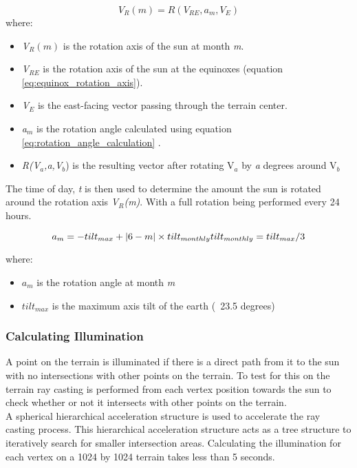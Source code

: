 \begin{equation} \label{eq:all_month_rotation_axis}
	V_{R}(m) = R(V_{RE}, a_{m}, V_{E})
\end{equation}
where:
\begin{itemize}
\item \textit{V$_{R}(m)$} is the rotation axis of the sun at month \textit{m}.\\
\item \textit{V$_{RE}$} is the rotation axis of the sun at the equinoxes (equation \ref{eq:equinox_rotation_axis}).\\
\item \textit{V$_{E}$} is the east-facing vector passing through the terrain center.\\
\item \textit{a$_{m}$} is the rotation angle calculated using equation \ref{eq:rotation_angle_calculation} .\\
\item \textit{R(V$_{a}$,\textit{a},V$_{b}$}) is the resulting vector after rotating V$_{a}$ by \textit{a} degrees around V$_{b}$\\
\end{itemize}

The time of day, \textit{t} is then used to determine the amount the sun is rotated around the rotation axis \textit{V$_{R}$(m)}. With a full rotation being performed every 24 hours.

\begin{equation} \label{eq:rotation_angle_calculation}
	a_{m} = -tilt_{max} + |6-m| \times tilt_{monthly} $$\\
$$
tilt_{monthly} = tilt_{max}/3
\end{equation}

where:
\begin{itemize}
\item \textit{$a_{m}$} is the rotation angle at month \textit{m}
\item \textit{$tilt_{max}$} is the maximum axis tilt of the earth (~23.5 degrees)
\end{itemize}

\subsubsection{Calculating Illumination}

A point on the terrain is illuminated if there is a direct path from it to the sun with no intersections with other points on the terrain. To test for this on the terrain ray casting is performed from each vertex position towards the sun to check whether or not it intersects with other points on the terrain.\\
A spherical hierarchical acceleration structure is used to accelerate the ray casting process. This hierarchical acceleration structure acts as a tree structure to iteratively search for smaller intersection areas. Calculating the illumination for each vertex on a 1024 by 1024 terrain takes less than 5 seconds.

